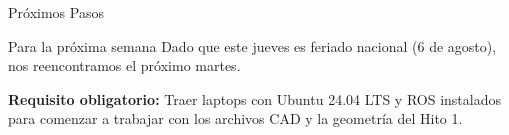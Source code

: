\documentclass[aspectratio=169]{beamer}
\begin{document}
\begin{frame}{Próximos Pasos}
    \begin{block}{Para la próxima semana}
        Dado que este jueves es feriado nacional (6 de agosto), nos reencontramos el próximo martes. 
        \vspace{0.2cm}
        
        \textbf{Requisito obligatorio:}
        Traer laptops con Ubuntu 24.04 LTS y ROS instalados para comenzar a trabajar con los archivos CAD y la geometría del Hito 1.
    \end{block}
\end{frame}
\end{document}

